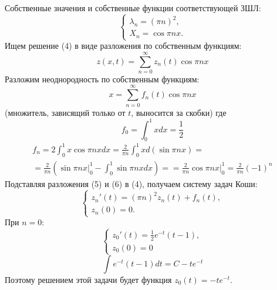 \documentclass[11pt]{article}
\begin{document}
Собственные значения и собственные функции соответствующей ЗШЛ:
\begin{equation*}
\begin{cases}
\lambda_n = (\pi n)^2, \\
X_n = \cos\pi n x.
\end{cases}
\end{equation*}
Ищем решение (4) в виде разложения по собственным функциям:
\begin{equation}
z(x, t) = \sum_{n = 0}^{\infty}z_n(t)\cos\pi n x
\end{equation}
Разложим неоднородность по собственным функциям:
\begin{equation}
x = \sum_{n = 0}^{\infty}f_n(t)\cos\pi nx
\end{equation}
(множитель, зависящий только от $t$, выносится за скобки) где
\begin{equation*}
f_0 = \int_0^1xdx = \frac12
\end{equation*}
\begin{multline*}
f_n = 2\int_0^1x\cos\pi nxdx = \frac2{\pi n}\int_0^1xd(\sin\pi nx) = \\
= \frac2{\pi n}\left(\sin\pi nx|_0^1 - \int_0^1\sin \pi nxdx\right) = 
= \frac2{\pi n}\cos\pi nx|_0^1 = \frac2{\pi n}(-1)^n
\end{multline*}
Подставляя разложения (5) и (6) в (4), получаем систему задач Коши:
\begin{equation}
\begin{cases}
z_n'(t) = (\pi n)^2z_n(t) + f_n(t), \\
z_n(0) = 0.
\end{cases}
\end{equation}
При $n = 0$:
\begin{equation*}
\begin{cases}
z_0'(t) = \frac12e^{-t}(t - 1), \\
z_0(0) = 0
\end{cases}
\end{equation*}
\begin{equation*}
\int e^{-t}(t - 1)dt = C - te^{-t}
\end{equation*}
Поэтому решением этой задачи будет функция $z_0(t) = -te^{-t}$.
\end{document}

